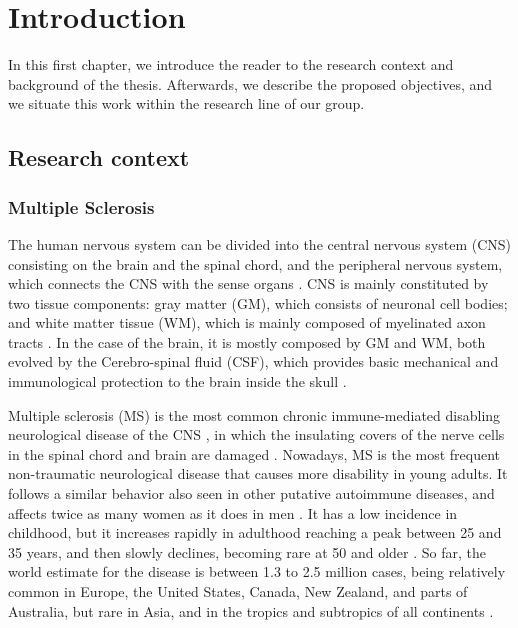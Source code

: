 \chapter{Introduction}


In this first chapter, we introduce the reader to the research context and background of the thesis. Afterwards, we describe the proposed objectives, and we situate this work within the research line of our group. 

\section{Research context}
\label{sec:introduction_research_context}

\subsection{Multiple Sclerosis}
\label{sub:introduction_multiple_sclerosis}

The human nervous system can be divided into the central nervous system (CNS) consisting on the brain and the spinal chord, and the peripheral nervous system, which connects the CNS with the sense organs \cite{Brodal2010}. CNS is mainly constituted by two tissue components: gray matter (GM), which consists of neuronal cell bodies; and white matter tissue (WM), which is mainly composed of myelinated axon tracts \cite{Sperber2006}. In the case of the brain,  it is mostly composed by GM and WM, both evolved by the Cerebro-spinal fluid (CSF), which provides basic mechanical and immunological protection to the brain inside the skull \cite{Sperber2006}. 

Multiple sclerosis (MS) is the most common chronic immune-mediated disabling neurological disease of the CNS \cite{Steinman1996}, in which the insulating covers of the nerve cells in the spinal chord and brain are damaged \cite{Compston2008}. Nowadays, MS is the most frequent non-traumatic neurological disease that causes more disability in young adults. It follows a similar behavior also seen in other putative autoimmune diseases, and affects twice as many women as it does in men \cite{Confavreux1980}. It has a low incidence in childhood, but it increases rapidly in adulthood reaching a peak between 25 and 35 years, and then slowly declines, becoming rare at 50 and older \cite{Cabezas2011}. So far, the world estimate for the disease is between 1.3 to 2.5 million cases, being relatively common in Europe, the United States, Canada, New Zealand, and parts of Australia, but rare in Asia, and in the tropics and subtropics of all continents \cite{Cabezas2011}. 


